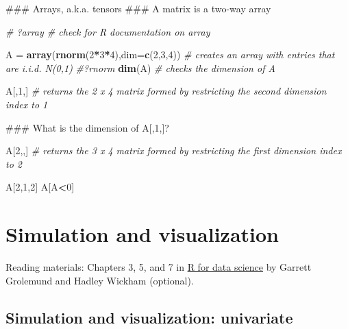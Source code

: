 \documentclass[12pt,]{book}
\newenvironment{Shaded}{\begin{snugshade}}{\end{snugshade}}
\newcommand{\KeywordTok}[1]{\textcolor[rgb]{0.13,0.29,0.53}{\textbf{#1}}}
\newcommand{\DataTypeTok}[1]{\textcolor[rgb]{0.13,0.29,0.53}{#1}}
\newcommand{\DecValTok}[1]{\textcolor[rgb]{0.00,0.00,0.81}{#1}}
\newcommand{\StringTok}[1]{\textcolor[rgb]{0.31,0.60,0.02}{#1}}
\newcommand{\CommentTok}[1]{\textcolor[rgb]{0.56,0.35,0.01}{\textit{#1}}}
\newcommand{\OperatorTok}[1]{\textcolor[rgb]{0.81,0.36,0.00}{\textbf{#1}}}
\newcommand{\NormalTok}[1]{#1}
\begin{document}
\begin{Shaded}
\begin{Highlighting}[]
\NormalTok{### Arrays, a.k.a. tensors}
\NormalTok{### A matrix is a two-way array}

\CommentTok{# ?array # check for R documentation on array}

\NormalTok{A =}\StringTok{ }\KeywordTok{array}\NormalTok{(}\KeywordTok{rnorm}\NormalTok{(}\DecValTok{2}\OperatorTok{*}\DecValTok{3}\OperatorTok{*}\DecValTok{4}\NormalTok{),}\DataTypeTok{dim=}\KeywordTok{c}\NormalTok{(}\DecValTok{2}\NormalTok{,}\DecValTok{3}\NormalTok{,}\DecValTok{4}\NormalTok{))  }\CommentTok{# creates an array with entries that are i.i.d. N(0,1)}
\CommentTok{#?rnorm}
\KeywordTok{dim}\NormalTok{(A) }\CommentTok{# checks the dimension of A}

\NormalTok{A[,}\DecValTok{1}\NormalTok{,] }\CommentTok{# returns the 2 x 4 matrix formed by restricting the second dimension index to 1}

\NormalTok{### What is the dimension of A[,1,]?}

\NormalTok{A[}\DecValTok{2}\NormalTok{,,] }\CommentTok{# returns the 3 x 4 matrix formed by restricting the first dimension index to 2}

\NormalTok{A[}\DecValTok{2}\NormalTok{,}\DecValTok{1}\NormalTok{,}\DecValTok{2}\NormalTok{]}
\NormalTok{A[A}\OperatorTok{<}\DecValTok{0}\NormalTok{]}
\end{Highlighting}
\end{Shaded}

\chapter{Simulation and visualization}\label{ch:sim}

Reading materials: Chapters 3, 5, and 7 in
\href{https://r4ds.had.co.nz/index.html}{R for data science} by Garrett
Grolemund and Hadley Wickham (optional).

\section{Simulation and visualization:
univariate}\label{simulation-and-visualization-univariate}
\end{document}
